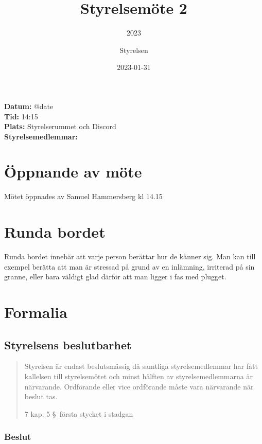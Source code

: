 \documentclass[protokoll]{dvd}
\begin{document}
\title{Styrelsemöte 2}
\subtitle{2023}
\author{Styrelsen}
\date{2023-01-31}

\textbf{Datum:} \csname @date\endcsname\\
\textbf{Tid:} 14:15\\
\textbf{Plats:} Styrelserummet och Discord\\
\textbf{Styrelsemedlemmar:}
\begin{närvarande_förtroendevalda}
\end{närvarande_förtroendevalda}

\section{Öppnande av möte}

Mötet öppnades av Samuel Hammersberg kl 14.15

\section{Runda bordet}

Runda bordet innebär att varje person berättar hur de känner sig.
Man kan till exempel berätta att man är stressad på grund av en inlämning, irriterad på sin granne, eller bara väldigt glad därför att man ligger i fas med plugget.

\section{Formalia}

\subsection{Styrelsens beslutbarhet}

\blockquote[7 kap. 5 \S~första stycket i stadgan][]{%
    Styrelsen är endast beslutsmässig då samtliga styrelsemedlemmar har fått kallelsen till styrelsemötet och minst hälften av styrelsemedlemmarna är närvarande.
    Ordförande eller vice ordförande måste vara närvarande när beslut tas.
}

\subsubsection*{Beslut}
\end{document}
